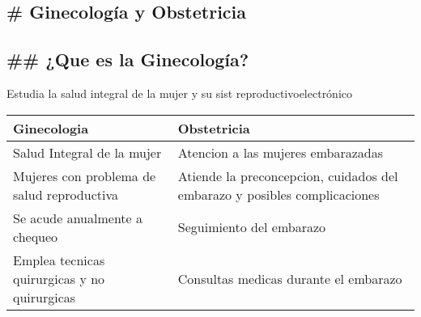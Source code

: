 \documentclass[
]{article}
\author{}
\date{}
\begin{document}
\hypertarget{ginecologuxeda-y-obstetricia}{%
\subsection{\# Ginecología y
Obstetricia}\label{ginecologuxeda-y-obstetricia}}

\hypertarget{que-es-la-ginecologuxeda}{%
\subsection{\#\# ¿Que es la
Ginecología?}\label{que-es-la-ginecologuxeda}}

Estudia la salud integral de la mujer y su sist reproductivoelectrónico

\begin{longtable}[]{@{}ll@{}}
\toprule
\begin{minipage}[b]{0.35\columnwidth}\raggedright
Ginecologia\strut
\end{minipage} & \begin{minipage}[b]{0.59\columnwidth}\raggedright
Obstetricia\strut
\end{minipage}\tabularnewline
\midrule
\endhead
\begin{minipage}[t]{0.35\columnwidth}\raggedright
Salud Integral de la mujer\strut
\end{minipage} & \begin{minipage}[t]{0.59\columnwidth}\raggedright
Atencion a las mujeres embarazadas\strut
\end{minipage}\tabularnewline
\begin{minipage}[t]{0.35\columnwidth}\raggedright
Mujeres con problema de salud reproductiva\strut
\end{minipage} & \begin{minipage}[t]{0.59\columnwidth}\raggedright
Atiende la preconcepcion, cuidados del embarazo y posibles
complicaciones\strut
\end{minipage}\tabularnewline
\begin{minipage}[t]{0.35\columnwidth}\raggedright
Se acude anualmente a chequeo\strut
\end{minipage} & \begin{minipage}[t]{0.59\columnwidth}\raggedright
Seguimiento del embarazo\strut
\end{minipage}\tabularnewline
\begin{minipage}[t]{0.35\columnwidth}\raggedright
Emplea tecnicas quirurgicas y no quirurgicas\strut
\end{minipage} & \begin{minipage}[t]{0.59\columnwidth}\raggedright
Consultas medicas durante el embarazo\strut
\end{minipage}\tabularnewline
\bottomrule
\end{longtable}
\end{document}
